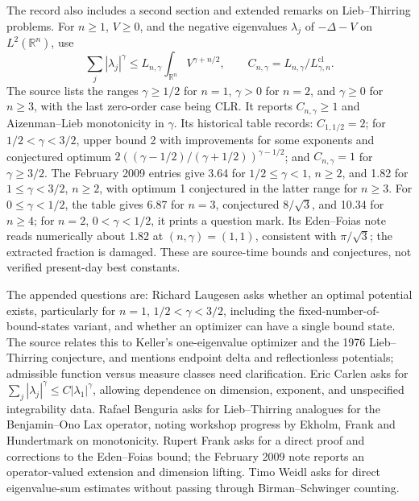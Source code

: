 \documentclass[11pt]{article}
\newcommand{\R}{\mathbb{R}}
\begin{document}
The record also includes a second section and extended remarks on Lieb--Thirring problems. For \(n\geq1\), \(V\geq0\), and the negative eigenvalues \(\lambda_j\) of \(-\Delta-V\) on \(L^2(\R^n)\), use
\[
 \sum_j|\lambda_j|^\gamma\leq L_{n,\gamma}\int_{\R^n}V^{\gamma+n/2},\qquad
 C_{n,\gamma}=L_{n,\gamma}/L_{\gamma,n}^{\mathrm{cl}}.
\]
The source lists the ranges \(\gamma\geq1/2\) for \(n=1\), \(\gamma>0\) for \(n=2\), and \(\gamma\geq0\) for \(n\geq3\), with the last zero-order case being CLR. It reports \(C_{n,\gamma}\geq1\) and Aizenman--Lieb monotonicity in \(\gamma\). Its historical table records: \(C_{1,1/2}=2\); for \(1/2<\gamma<3/2\), upper bound 2 with improvements for some exponents and conjectured optimum
\(2((\gamma-1/2)/(\gamma+1/2))^{\gamma-1/2}\); and \(C_{n,\gamma}=1\) for \(\gamma\geq3/2\). The February 2009 entries give 3.64 for \(1/2\leq\gamma<1\), \(n\geq2\), and 1.82 for \(1\leq\gamma<3/2\), \(n\geq2\), with optimum 1 conjectured in the latter range for \(n\geq3\). For \(0\leq\gamma<1/2\), the table gives 6.87 for \(n=3\), conjectured \(8/\sqrt3\), and 10.34 for \(n\geq4\); for \(n=2\), \(0<\gamma<1/2\), it prints a question mark. Its Eden--Foias note reads numerically about 1.82 at \((n,\gamma)=(1,1)\), consistent with \(\pi/\sqrt3\); the extracted fraction is damaged. These are source-time bounds and conjectures, not verified present-day best constants.

The appended questions are: Richard Laugesen asks whether an optimal potential exists, particularly for \(n=1\), \(1/2<\gamma<3/2\), including the fixed-number-of-bound-states variant, and whether an optimizer can have a single bound state. The source relates this to Keller's one-eigenvalue optimizer and the 1976 Lieb--Thirring conjecture, and mentions endpoint delta and reflectionless potentials; admissible function versus measure classes need clarification. Eric Carlen asks for \(\sum_j|\lambda_j|^\gamma\leq C|\lambda_1|^\gamma\), allowing dependence on dimension, exponent, and unspecified integrability data. Rafael Benguria asks for Lieb--Thirring analogues for the Benjamin--Ono Lax operator, noting workshop progress by Ekholm, Frank and Hundertmark on monotonicity. Rupert Frank asks for a direct proof and corrections to the Eden--Foias bound; the February 2009 note reports an operator-valued extension and dimension lifting. Timo Weidl asks for direct eigenvalue-sum estimates without passing through Birman--Schwinger counting.
\end{document}
